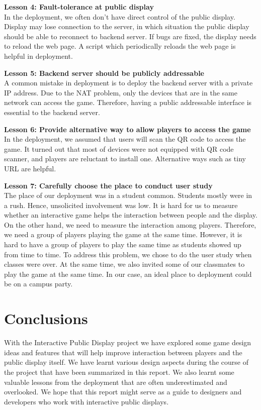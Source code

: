 \documentclass{sig-alternate}
\begin{document}
\textbf{Lesson 4: Fault-tolerance at public display}\\
In the deployment, we often don't have direct control of the public display. Display may lose connection to the server, in which situation the public display should be able to reconnect to backend server. If bugs are fixed, the display needs to reload the web page. A script which periodically reloads the web page is helpful in deployment.

\textbf{Lesson 5: Backend server should be publicly addressable}\\
A common mistake in deployment is to deploy the backend server with a private IP address. Due to the NAT problem, only the devices that are in the same network can access the game. Therefore, having a public addressable interface is essential to the backend server.

\textbf{Lesson 6: Provide alternative way to allow players to access the game}\\
In the deployment, we assumed that users will scan the QR code to access the game. It turned out that most of devices were not equipped with QR code scanner, and players are reluctant to install one. Alternative ways such as tiny URL are helpful. 

\textbf{Lesson 7: Carefully choose the place to conduct user study}\\
The place of our deployment was in a student common. Students mostly were in a rush. Hence, unsolicited involvement was low. It is hard for us to measure whether an interactive game helps the interaction between people and the display. On the other hand, we need to measure the interaction among players. Therefore, we need a group of players playing the game at the same time. However, it is hard to have a group of players to play the same time as students showed up from time to time. To address this problem, we chose to do the user study when classes were over. At the same time, we also invited some of our classmates to play the game at the same time. In our case, an ideal place to deployment could be on a campus party.

\section{Conclusions}
With the Interactive Public Display project we have explored some game design ideas and features that will help improve interaction between players and the public display itself. We have learnt various design aspects during the course of the project that have been summarized in this report. We also learnt some valuable lessons from the deployment that are often underestimated and overlooked\cite{storz:deployment_lessons}. We hope that this report might serve as a guide to designers and developers who work with interactive public displays.
\end{document}
